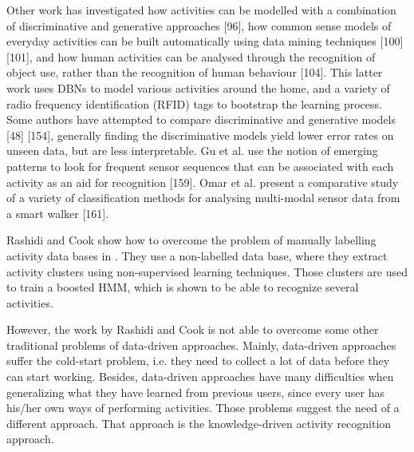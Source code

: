 Other work has investigated how activities can be modelled with a combination of discriminative and generative approaches [96], how common sense models of everyday activities can be built automatically using data mining techniques [100] [101], and how human activities can be analysed through the recognition of object use, rather than the recognition of human behaviour [104]. This latter work uses DBNs to model various activities around the home, and a variety of radio frequency identification (RFID) tags to bootstrap the learning process. Some authors have attempted to compare discriminative and generative models [48] [154], generally finding the discriminative models yield lower error rates on unseen data, but are less interpretable. Gu et al. use the notion of emerging patterns to look for frequent sensor sequences that can be associated with each activity as an aid for recognition [159]. Omar et al. present a comparative study of a variety of classification methods for analysing multi-modal sensor data from a smart walker [161].

Rashidi and Cook show how to overcome the problem of manually labelling activity data bases in \cite{Rashidi2011}. They use a non-labelled data base, where they extract activity clusters using non-supervised learning techniques. Those clusters are used to train a boosted HMM, which is shown to be able to recognize several activities. 

However, the work by Rashidi and Cook is not able to overcome some other traditional problems of data-driven approaches. Mainly, data-driven approaches suffer the cold-start problem, i.e. they need to collect a lot of data before they can start working. Besides, data-driven approaches have many difficulties when generalizing what they have learned from previous users, since every user has his/her own ways of performing activities. Those problems suggest the need of a different approach. That approach is the knowledge-driven activity recognition approach.

